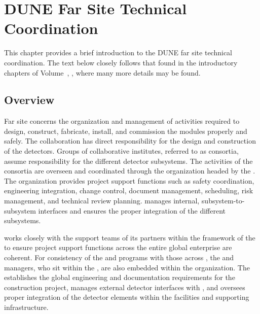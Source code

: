 \chapter{DUNE Far Site Technical Coordination}
\label{ch:exec-tc}

This chapter provides a brief introduction to the DUNE far site technical coordination.  The text below closely follows that found in the introductory chapters of Volume~\volnumbertc{}, \voltitletc{}, where many more details may be found.

\section{Overview}

Far site  concerns the organization and management of 
activities required to design, construct,
fabricate, install, and commission the   modules properly and safely. 
      The  collaboration has direct responsibility for the design 
and construction of the  detectors.  Groups of collaborative 
institutes, referred to as consortia, assume responsibility for 
the different detector subsystems.  The activities of the consortia are 
overseen and coordinated through the   organization 
headed by the  .  The  organization 
provides project support functions such as safety coordination, 
engineering integration, change control, document management, scheduling, 
risk management, and technical review planning.    
manages internal, subsystem-to-subsystem interfaces and ensures the proper integration of the different subsystems.   

  works closely with the support teams of its 
 partners within the framework of the  to 
ensure project support functions across the entire global 
enterprise are coherent.  For consistency of the   
and  programs with those across , the 
  and  managers, who sit within 
the , are also embedded within the   
organization.  The  establishes the global engineering
and documentation requirements for the  
 construction project, manages external  detector 
interfaces with , and oversees proper 
integration of the  detector elements within the facilities 
and supporting infrastructure.  

